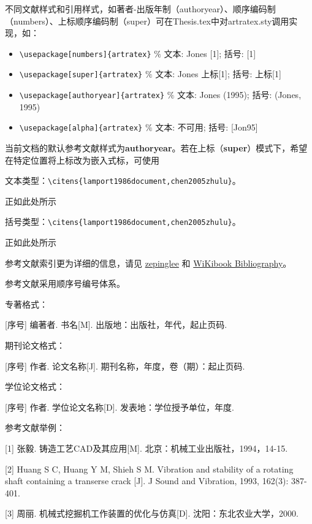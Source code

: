 不同文献样式和引用样式，如著者-出版年制（authoryear）、顺序编码制（numbers）、上标顺序编码制（super）可在Thesis.tex中对artratex.sty调用实现，如：
\begin{itemize}
    \footnotesize
    \item \verb+\usepackage[numbers]{artratex}+ $\%$ 文本: Jones [1]; 括号: [1]
    \item \verb+\usepackage[super]{artratex}+ $\%$ 文本: Jones 上标[1]; 括号: 上标[1]
    \item \verb+\usepackage[authoryear]{artratex}+ $\%$ 文本: Jones (1995); 括号: (Jones, 1995)
    \item \verb+\usepackage[alpha]{artratex}+ $\%$ 文本: 不可用; 括号: [Jon95]
\end{itemize}

当前文档的默认参考文献样式为\textbf{authoryear}。若在上标（\textbf{super}）模式下，希望在特定位置将上标改为嵌入式标，可使用

文本类型：\verb|\citens{lamport1986document,chen2005zhulu}|。

正如此处所示\cite{lamport1986document,chen2005zhulu}

括号类型：\verb|\citens{lamport1986document,chen2005zhulu}|。

正如此处所示\cite{lamport1986document,chen2005zhulu}

参考文献索引更为详细的信息，请见 \href{https://github.com/zepinglee/gbt7714-bibtex-style}{zepinglee} 和 \href{https://en.wikibooks.org/wiki/LaTeX/Bibliography_Management}{WiKibook Bibliography}。


参考文献采用顺序号编号体系。

专著格式： 

[序号] 编著者. 书名[M]. 出版地：出版社，年代，起止页码.

期刊论文格式： 

[序号] 作者. 论文名称[J]. 期刊名称，年度，卷（期）：起止页码.

学位论文格式： 

[序号] 作者. 学位论文名称[D]. 发表地：学位授予单位，年度.

参考文献举例： 

[1] 张毅. 铸造工艺CAD及其应用[M]. 北京：机械工业出版社，1994，14-15. 

[2] Huang S C, Huang Y M, Shieh S M. Vibration and stability of a rotating shaft containing a transerse crack [J]. J Sound and Vibration, 1993, 162(3): 387-401.

[3] 周丽. 机械式挖掘机工作装置的优化与仿真[D]. 沈阳：东北农业大学，2000.


